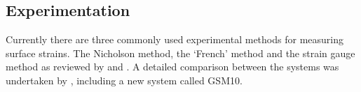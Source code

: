 \subsection{Experimentation}
Currently there are three commonly used experimental methods for measuring
surface strains. The Nicholson method, the `French' method and the strain
gauge method as reviewed by \citet{Murphy_2005,Yoshida_2002} and \citet{yang2005measurement}. A detailed comparison between the systems was undertaken by \citet{kamarudin2014new}, including a new system called GSM10.  